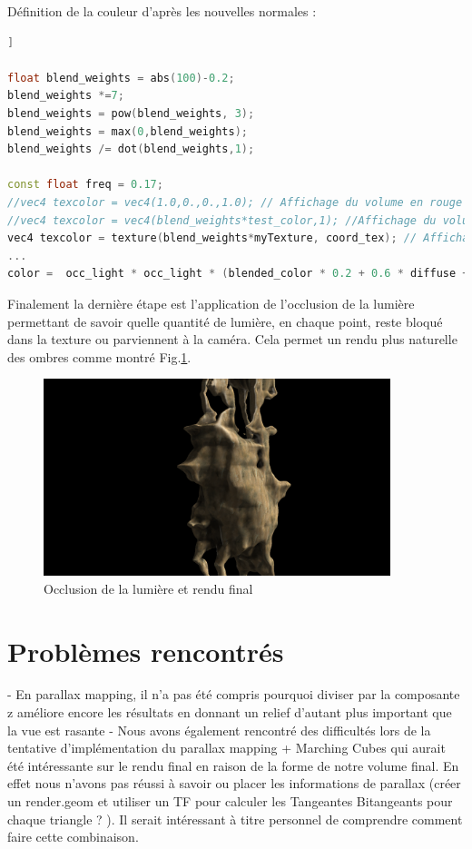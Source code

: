 \documentclass[a4paper]{article}
\begin{document}
Définition de la couleur d'après les nouvelles normales : 
\begin{lstlisting}[language=C++,
                   directivestyle={\color{black}}
                   emph={int,char,double,float,unsigned},
                   emphstyle={\color{blue}}]]
 
float blend_weights = abs(100)-0.2;
blend_weights *=7;
blend_weights = pow(blend_weights, 3);
blend_weights = max(0,blend_weights);
blend_weights /= dot(blend_weights,1);
  
const float freq = 0.17;
//vec4 texcolor = vec4(1.0,0.,0.,1.0); // Affichage du volume en rouge
//vec4 texcolor = vec4(blend_weights*test_color,1); //Affichage du volume avec couleurs par normales ponderees
vec4 texcolor = texture(blend_weights*myTexture, coord_tex); // Affichage du volume avec texture    
...
color =  occ_light * occ_light * (blended_color * 0.2 + 0.6 * diffuse + 0.3 * vec4(vec3(specular), 1.0));              
\end{lstlisting}

Finalement la dernière étape est l'application de l'occlusion de la lumière permettant de savoir quelle quantité de lumière, en chaque point, reste bloqué dans la texture ou parviennent à la caméra. Cela permet un rendu plus naturelle des ombres comme montré Fig.\ref{finalRendu}.
\begin{figure}[H]
\centering
\label{normalt1} \includegraphics[width=0.9\textwidth]{figures/final.png}
\caption{Occlusion de la lumière et rendu final}
\label{finalRendu}
\end{figure}

\section{Problèmes rencontrés}

- En parallax mapping, il n'a pas été compris pourquoi diviser par la composante z améliore encore les résultats en donnant un relief d’autant plus important que la vue est rasante
- Nous avons également rencontré des difficultés lors de la tentative d'implémentation du parallax mapping + Marching Cubes qui aurait été intéressante sur le rendu final en raison de la forme de notre volume final. En effet nous n'avons pas réussi à savoir ou placer les informations de parallax (créer un render.geom et utiliser un TF pour calculer les Tangeantes Bitangeants pour chaque triangle ? ). Il serait intéressant à titre personnel de comprendre comment faire cette combinaison.



\end{document}
